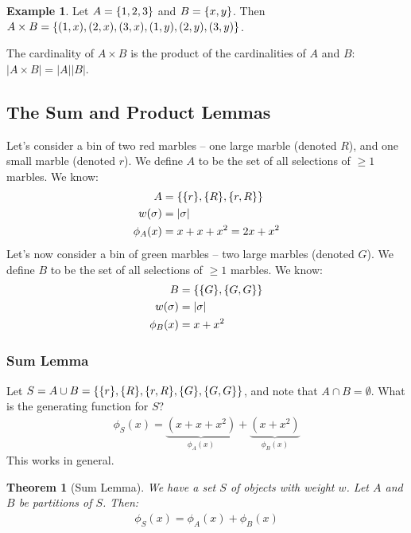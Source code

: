 \documentclass[]{article}
\newtheorem*{theorem}{Theorem}
\theoremstyle{definition}
\newtheorem{ex}{Example}[section]
\newcommand{\union}{\cup}
\newcommand{\intersection}{\cap}
\DeclarePairedDelimiter{\set}{\lbrace}{\rbrace}
\begin{document}
				\begin{ex}
					Let $A = \set{1, 2, 3}$ and $B = \set{x, y}$. Then $A \times B = \set{(1, x), (2, x), (3, x), (1, y), (2, y), (3, y) }$.
				\end{ex}

				The cardinality of $A \times B$ is the product of the cardinalities of $A$ and $B$: $|A \times B| = |A||B|$.
		\subsection{The Sum and Product Lemmas}
			Let's consider a bin of two red marbles -- one large marble (denoted $R$), and one small marble (denoted $r$). We define $A$ to be the set of all selections of $\ge 1$ marbles. We know: 
			\begin{align*}
				A &= \set{\set{r}, \set{R}, \set{r, R} } \\
				w(\sigma) &= |\sigma| \\
				\phi_A(x) &= x + x + x^2 = 2x + x^2
			\end{align*}
			Let's now consider a bin of green marbles -- two large marbles (denoted $G$). We define $B$ to be the set of all selections of $\ge 1$ marbles. We know:
			\begin{align*}
				B &= \set{\set{G}, \set{G, G} } \\
				w(\sigma) &= |\sigma| \\
				\phi_B(x) &= x + x^2
			\end{align*}
			\subsubsection{Sum Lemma}
				Let $S = A \union B = \set{\set{r}, \set{R}, \set{r, R}, \set{G}, \set{G, G} }$, and note that $A \intersection B = \emptyset$. What is the generating function for $S$?
				\begin{align*}
					\phi_S(x) = \underbrace{(x + x + x^2)}_{\phi_A(x)} + \underbrace{(x  + x^2)}_{\phi_B(x)}
				\end{align*}
				This works in general.
				
				\begin{theorem}[Sum Lemma]
					We have a set $S$ of objects with weight $w$. Let $A$ and $B$ be partitions of $S$. Then:
					\begin{align*}
						\phi_S(x) = \phi_A(x) + \phi_B(x)
					\end{align*}
				\end{theorem}
\end{document}
